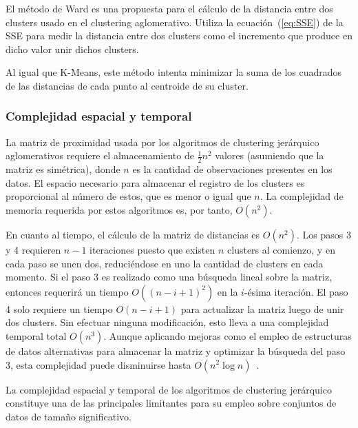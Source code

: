 El método de Ward es una propuesta para el cálculo de la distancia entre dos clusters usado en el clustering aglomerativo.
Utiliza la ecuación~(\ref{eq:SSE}) de la SSE para medir la distancia entre dos clusters como el incremento que produce en dicho valor unir dichos clusters.

Al igual que K-Means, este método intenta minimizar la suma de los cuadrados de las distancias de cada punto al centroide de su cluster.

\subsubsection{Complejidad espacial y temporal}

La matriz de proximidad usada por los algoritmos de clustering jerárquico aglomerativos requiere el almacenamiento de $\frac{1}{2}n^2$ valores (asumiendo que la matriz es simétrica), donde $n$ es la cantidad de observaciones presentes en los datos.
El espacio necesario para almacenar el registro de los clusters es proporcional al número de estos, que es menor o igual que $n$.
La complejidad de memoria requerida por estos algoritmos es, por tanto, $O(n^2)$.

En cuanto al tiempo, el cálculo de la matriz de distancias es $O(n^2)$.
Los pasos 3 y 4 requieren $n-1$ iteraciones puesto que existen $n$ clusters al comienzo, y en cada paso se unen dos, reduciéndose en uno la cantidad de clusters en cada momento.
Si el paso 3 es realizado como una búsqueda lineal sobre la matriz, entonces requerirá un tiempo $O((n-i+1)^2)$ en la $i$-ésima iteración.
El paso 4 solo requiere un tiempo $O(n-i+1)$ para actualizar la matriz luego de unir dos clusters.
Sin efectuar ninguna modificación, esto lleva a una complejidad temporal total $O(n^3)$.
Aunque aplicando mejoras como el empleo de estructuras de datos alternativas para almacenar la matriz y optimizar la búsqueda del paso 3, esta complejidad puede disminuirse hasta $O(n^2\log{n})$~\cite{Tan05}.

La complejidad espacial y temporal de los algoritmos de clustering jerárquico constituye una de las principales limitantes para su empleo sobre conjuntos de datos de tamaño significativo.